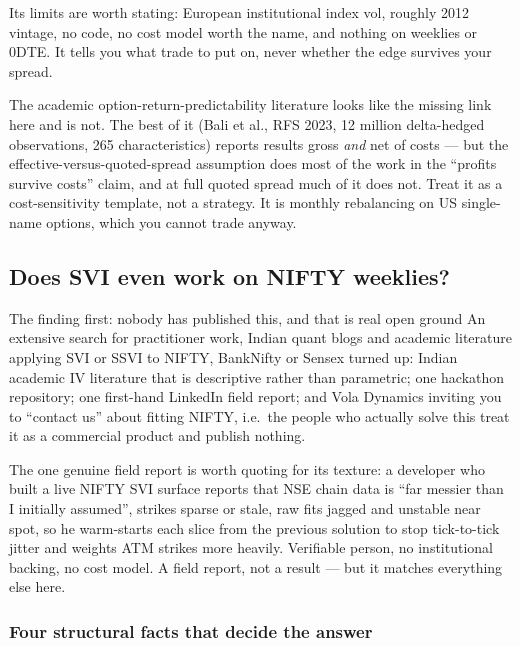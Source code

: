 \documentclass[11pt,a4paper]{article}
\begin{document}
Its limits are worth stating: European institutional index vol, roughly 2012
vintage, no code, no cost model worth the name, and nothing on weeklies or 0DTE.
It tells you what trade to put on, never whether the edge survives your spread.

\begin{waste}
The academic option-return-predictability literature looks like the missing link
here and is not. The best of it (Bali et al., RFS 2023, 12 million delta-hedged
observations, 265 characteristics) reports results gross \emph{and} net of costs
--- but the effective-versus-quoted-spread assumption does most of the work in
the ``profits survive costs'' claim, and at full quoted spread much of it does
not. Treat it as a cost-sensitivity template, not a strategy. It is monthly
rebalancing on US single-name options, which you cannot trade anyway.
\end{waste}

\subsection{Does SVI even work on NIFTY weeklies?}

\begin{keyfact}{The finding first: nobody has published this, and that is real open ground}
An extensive search for practitioner work, Indian quant blogs and academic
literature applying SVI or SSVI to NIFTY, BankNifty or Sensex turned up: Indian
academic IV literature that is descriptive rather than parametric; one hackathon
repository; one first-hand LinkedIn field report; and Vola Dynamics inviting you
to ``contact us'' about fitting NIFTY, i.e.\ the people who actually solve this
treat it as a commercial product and publish nothing.
\end{keyfact}

The one genuine field report is worth quoting for its texture: a developer who
built a live NIFTY SVI surface reports that NSE chain data is ``far messier than
I initially assumed'', strikes sparse or stale, raw fits jagged and unstable near
spot, so he warm-starts each slice from the previous solution to stop
tick-to-tick jitter and weights ATM strikes more heavily. Verifiable person, no
institutional backing, no cost model. A field report, not a result --- but it
matches everything else here.

\subsubsection{Four structural facts that decide the answer}
\end{document}
